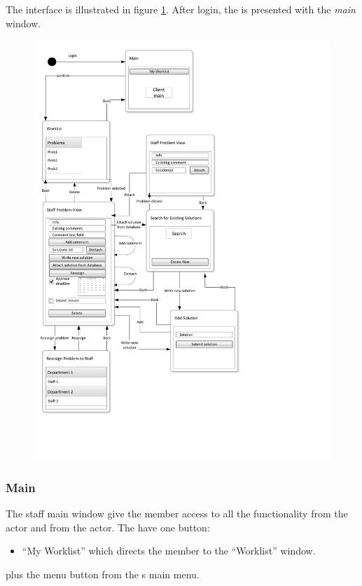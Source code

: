 
\subsection{\sinterface}
The \astaff[] interface is illustrated in figure \ref{fig:staff_interface}.
After login, the \astaff[] is presented with the \textit{main} window. 

\begin{figure}[H]
	\centering
		\includegraphics[width = \textwidth, clip=true, trim=0 4cm 5cm 0]{input/application_domain_analysis/Navigation_DiagramStaff.pdf}
	\morscaption{\sinterface[c]}
	\label{fig:staff_interface} %
\end{figure}

\subsubsection{Main}
The staff main window give the \astaff member access to all the functionality from the \astaff actor and from the \aclient actor. The \astaff have one button:
\begin{itemize}
	\item ``My Worklist'' which directs the \astaff member to the ``Worklist'' window. 
\end{itemize}   
plus the menu button from the \aclient s main menu.

